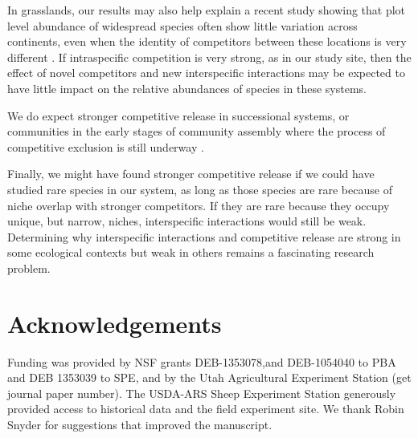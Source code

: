 \documentclass[11pt]{article}
\begin{document}
\begin{doublespacing}

In grasslands, our results may also help explain a recent study showing that plot level abundance of widespread species often show little variation across continents, even when the identity of competitors between these locations is very different \citep{firn_abundance_2011}. If intraspecific competition is very strong, as in our study site, then the effect of novel competitors and new interspecific interactions may be expected to have little impact on the relative abundances of species in these systems.   

We do expect stronger competitive release in successional systems, or communities in the early stages of community assembly where the process of competitive exclusion is still underway \citep{kokkoris_patterns_1999}. 

Finally, we might have found stronger competitive release if we could have studied rare species in our system, as long as those species are rare because of niche overlap with stronger competitors. If they are rare because they occupy unique, but narrow, niches, interspecific interactions would still be weak. Determining why interspecific interactions and competitive release are strong in some ecological contexts but weak in others remains a fascinating research problem. 
  
\section*{Acknowledgements}

Funding was provided by NSF grants DEB-1353078,and  DEB-1054040 to PBA and DEB 1353039 to SPE, and by the Utah Agricultural Experiment Station (get journal paper number). The USDA-ARS Sheep Experiment Station generously provided access to historical data and the field experiment site.  We thank Robin Snyder for suggestions that improved the manuscript.

\newpage




\end{doublespacing} 

\end{document}

